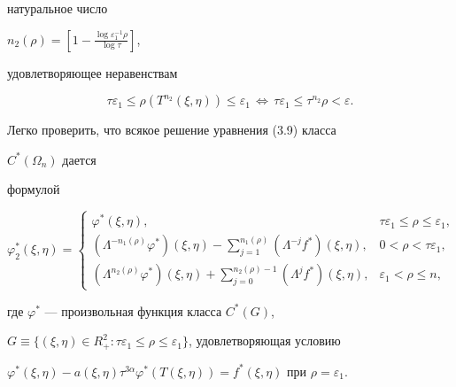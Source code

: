 \begin{pf}
натуральное число


$n_2(\rho)=\left[1-\frac{\log\varepsilon^{-1}_1\rho}{\log\tau}\right]$,


удовлетворяющее неравенствам


$$


\tau\varepsilon_1\le \rho(T^{n_2}(\xi,\eta))\le\varepsilon_1\,


\Longleftrightarrow\,


\tau\varepsilon_1\le\tau^{n_2}\rho<\varepsilon.


$$





Легко проверить, что всякое решение уравнения (3.9) класса


$C^*(\Omega_n)$ дается


формулой


\begin{equation}


\varphi^*_2(\xi,\eta)=


\begin{cases}


\displaystyle \varphi^*(\xi,\eta), & \tau\varepsilon_1\le


\rho\le\varepsilon_1, \\


\displaystyle (\Lambda^{-n_1(\rho)}\varphi^*)(\xi,\eta)-


\sum\limits^{n_1(\rho)}_{j=1}(\Lambda^{-j}f^*)(\xi,\eta), &


0<\rho<\tau\varepsilon_1, \\


\displaystyle (\Lambda^{n_2(\rho)}\varphi^*)(\xi,\eta)+


\sum\limits^{n_2(\rho)-1}_{j=0}(\Lambda^j f^*)(\xi,\eta), &


\varepsilon_1<\rho\le n,


\end{cases}


\end{equation}


где $\varphi^*$ --- произвольная функция класса $C^*(G)$,


$G\equiv\{(\xi,\eta)\in R^2_+:\tau\varepsilon_1\le\rho\le


\varepsilon_1\}$, удовлетворяющая условию


$\varphi^*(\xi,\eta)-a(\xi,\eta)\tau^{3\alpha}\varphi^*


(T(\xi,\eta))=f^*(\xi,\eta)$ при $\rho=\varepsilon_1$.






\end{pf}
